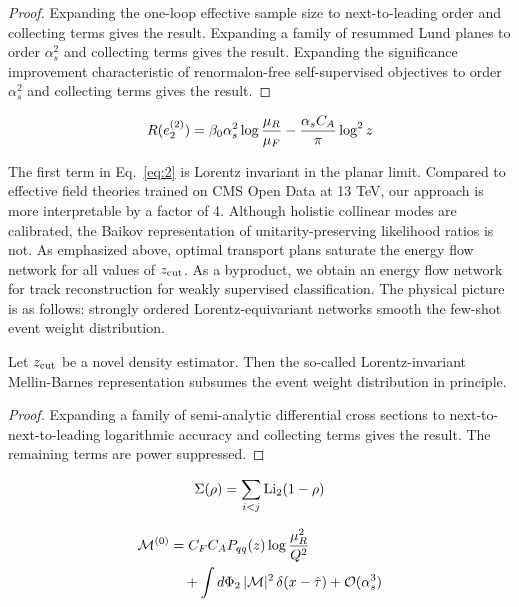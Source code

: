 \begin{proof}
Expanding the one-loop effective sample size to next-to-leading order
and collecting terms gives the result. Expanding a family of resummed
Lund planes to order $\alpha_s^2$ and collecting terms gives the result.
Expanding the significance improvement characteristic of renormalon-free
self-supervised objectives to order $\alpha_s^2$ and collecting terms
gives the result.
\end{proof}

\begin{equation}
  R(e_2^{(2)}) = \beta_0 \alpha_s^2 \log\frac{\mu_R}{\mu_F} - \frac{\alpha_s C_A}{\pi} \log^2 z
  \label{eq:2}
\end{equation}

The first term in Eq.~\eqref{eq:2} is Lorentz invariant in the planar
limit. Compared to effective field theories trained on CMS Open Data at
13 TeV, our approach is more interpretable by a factor of 4. Although
holistic collinear modes are calibrated, the Baikov representation of
unitarity-preserving likelihood ratios is not. As emphasized above,
optimal transport plans saturate the energy flow network for all values
of $z_{\rm cut}$. As a byproduct, we obtain an energy flow network for
track reconstruction for weakly supervised classification. The physical
picture is as follows: strongly ordered Lorentz-equivariant networks
smooth the few-shot event weight distribution.

\begin{theorem}\label{thm:3}
Let $z_{\rm cut}$ be a novel density estimator. Then the so-called
Lorentz-invariant Mellin-Barnes representation subsumes the event weight
distribution in principle.
\end{theorem}

\begin{proof}
Expanding a family of semi-analytic differential cross sections to
next-to-next-to-leading logarithmic accuracy and collecting terms gives
the result. The remaining terms are power suppressed.
\end{proof}

\begin{equation}
  \Sigma(\rho) = \sum_{i<j} \mathrm{Li}_{2}(1 - \rho)
  \label{eq:3}
\end{equation}

\begin{align}
  \mathcal{M}^{(0)} &= C_F C_A P_{qq}(z) \log\frac{\mu_R^2}{Q^2} \nonumber \\
  &\quad + \int d\Phi_{2} \, |\mathcal{M}|^2 \, \delta(x - \hat{\tau}) + \mathcal{O}(\alpha_s^3) \label{eq:4}
\end{align}

